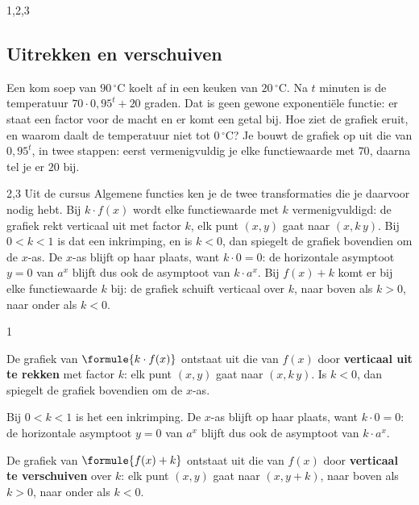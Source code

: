 \begin{alleenvoor}{1,2,3}
\begin{oefeningen}

\end{oefeningen}

\subsection{Uitrekken en verschuiven}

Een kom soep van $90\,^\circ$C koelt af in een keuken van $20\,^\circ$C. Na $t$ minuten is de temperatuur $70 \cdot 0{,}95^t + 20$ graden. Dat is geen gewone exponentiële functie: er staat een factor voor de macht en er komt een getal bij. Hoe ziet de grafiek eruit, en waarom daalt de temperatuur niet tot $0\,^\circ$C? Je bouwt de grafiek op uit die van $0{,}95^t$, in twee stappen: eerst vermenigvuldig je elke functiewaarde met $70$, daarna tel je er $20$ bij.

\end{alleenvoor}
\begin{alleenvoor}{2,3}
Uit de cursus Algemene functies ken je de twee transformaties die je daarvoor nodig hebt. Bij $k \cdot f(x)$ wordt elke functiewaarde met $k$ vermenigvuldigd: de grafiek rekt verticaal uit met factor $k$, elk punt $(x, y)$ gaat naar $(x, k\,y)$. Bij $0 < k < 1$ is dat een inkrimping, en is $k < 0$, dan spiegelt de grafiek bovendien om de $x$-as. De $x$-as blijft op haar plaats, want $k \cdot 0 = 0$: de horizontale asymptoot $y = 0$ van $a^x$ blijft dus ook de asymptoot van $k \cdot a^x$. Bij $f(x) + k$ komt er bij elke functiewaarde $k$ bij: de grafiek schuift verticaal over $k$, naar boven als $k > 0$, naar onder als $k < 0$.

\end{alleenvoor}
\begin{alleenvoor}{1}
\begin{theorie}
De grafiek van $\formule{k \cdot f(x)}$ ontstaat uit die van $f(x)$ door \textbf{\textcolor{accent}{verticaal uit te rekken}} met factor $k$: elk punt $(x, y)$ gaat naar $(x, k\,y)$. Is $k < 0$, dan spiegelt de grafiek bovendien om de $x$-as.
\end{theorie}

Bij $0 < k < 1$ is het een inkrimping. De $x$-as blijft op haar plaats, want $k \cdot 0 = 0$: de horizontale asymptoot $y = 0$ van $a^x$ blijft dus ook de asymptoot van $k \cdot a^x$.

\begin{theorie}
De grafiek van $\formule{f(x) + k}$ ontstaat uit die van $f(x)$ door \textbf{\textcolor{accent}{verticaal te verschuiven}} over $k$: elk punt $(x, y)$ gaat naar $(x, y + k)$, naar boven als $k > 0$, naar onder als $k < 0$.
\end{theorie}
\end{alleenvoor}
